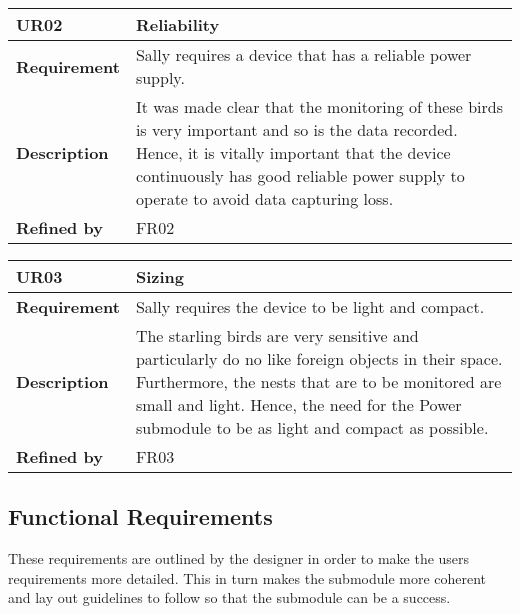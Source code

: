 \documentclass[class=report,11pt,crop=false]{standalone}
\begin{document}
 

\begin{table}
\centering

\begin{tabular}{| l | l |}
\hline
\textbf{UR02} & \textbf{Reliability} \\
\hline
\textbf{Requirement} & Sally requires a device that has a reliable power supply.  \\
\hline
\textbf{Description} & It was made clear that the monitoring of these birds is very important and so is the data recorded. Hence, it is vitally important that the device continuously has good reliable power supply to operate to avoid data capturing loss. \\
\hline
\textbf{Refined by} & FR02 \\
\hline

\end{tabular}

\end{table}

 

\begin{table}
\centering

\begin{tabular}{| l | l |}
\hline
\textbf{UR03} & \textbf{Sizing} \\
\hline
\textbf{Requirement} & Sally requires the device to be light and compact. \\
\hline
\textbf{Description} & The starling birds are very sensitive and particularly do no like foreign objects in their space. Furthermore, the nests that are to be monitored are small and light. Hence, the need for the Power submodule to be as light and compact as possible. \\
\hline
\textbf{Refined by} & FR03 \\
\hline

\end{tabular}

\end{table}

 

\subsection{Functional Requirements}

These requirements are outlined by the designer in order to make the users requirements more detailed. This in turn makes the submodule more coherent and lay out guidelines to follow so that the submodule can be a success.
\end{document}
